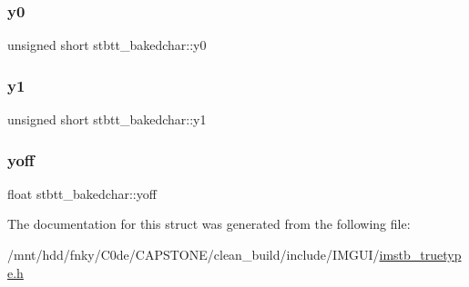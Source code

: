 \subsubsection{\texorpdfstring{y0}{y0}}
{\footnotesize\ttfamily unsigned short stbtt\+\_\+bakedchar\+::y0}

\mbox{\label{structstbtt__bakedchar_ac831dc667f6c39b5d22740c6cbd5bc3f}} 
\subsubsection{\texorpdfstring{y1}{y1}}
{\footnotesize\ttfamily unsigned short stbtt\+\_\+bakedchar\+::y1}

\mbox{\label{structstbtt__bakedchar_aba01393e52d1c6f4ce86a8b51e498bb4}} 
\subsubsection{\texorpdfstring{yoff}{yoff}}
{\footnotesize\ttfamily float stbtt\+\_\+bakedchar\+::yoff}



The documentation for this struct was generated from the following file\+:\begin{DoxyCompactItemize}
\item 
/mnt/hdd/fnky/\+C0de/\+C\+A\+P\+S\+T\+O\+N\+E/clean\+\_\+build/include/\+I\+M\+G\+U\+I/\hyperlink{imstb__truetype_8h}{imstb\+\_\+truetype.\+h}\end{DoxyCompactItemize}
